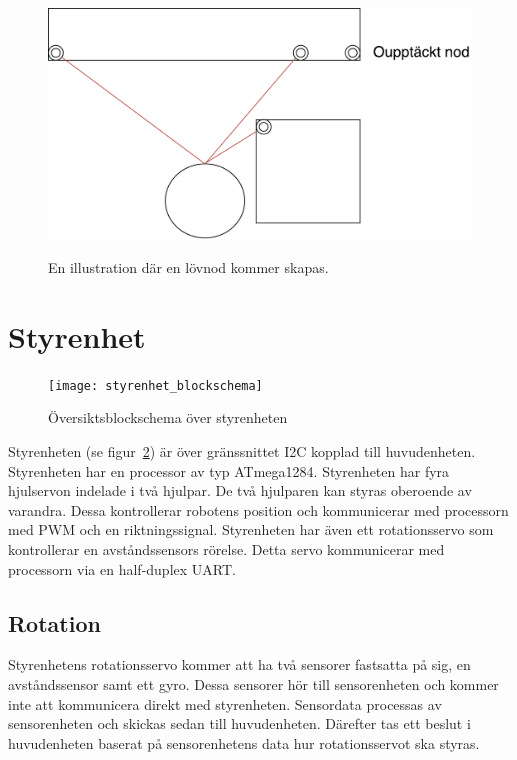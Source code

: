 \documentclass{article}
\begin{document}
\begin{figure}[H]
  \centering
  \includegraphics[scale=0.5,keepaspectratio]{KartgrafLov} \\
  \caption{En illustration där en lövnod kommer skapas.}
  \label{fig:KartgrafLov}
\end{figure}

\section{Styrenhet}
\begin{figure}[H]
\centering
\texttt{[image: styrenhet\_blockschema]}
\caption{Översiktsblockschema över styrenheten}
\label{fig:styrenhet}
\end{figure}
Styrenheten (se figur~\ref{fig:styrenhet}) är över gränssnittet I2C kopplad till huvudenheten.\newline\newline
Styrenheten har en processor av typ ATmega1284.\newline\newline
Styrenheten har fyra hjulservon indelade i två hjulpar. De två hjulparen kan styras oberoende av varandra. Dessa kontrollerar robotens position och kommunicerar med processorn med PWM och en riktningssignal.\newline\newline
Styrenheten har även ett rotationsservo som kontrollerar en avståndssensors rörelse. Detta servo kommunicerar med processorn via en half-duplex UART.\newline\newline

\subsection{Rotation}
Styrenhetens rotationsservo kommer att ha två sensorer fastsatta på sig, en avståndssensor samt ett gyro. Dessa sensorer hör till sensorenheten och kommer inte att kommunicera direkt med styrenheten. Sensordata processas av sensorenheten och skickas sedan till huvudenheten. Därefter tas ett beslut i huvudenheten baserat på sensorenhetens data hur rotationsservot ska styras. 
\end{document}
